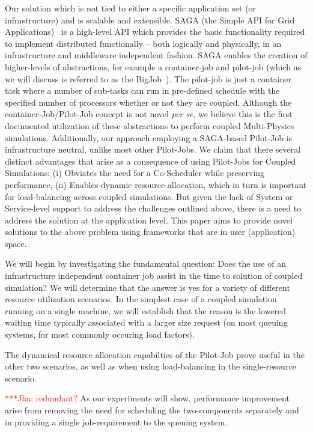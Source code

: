 \documentclass[conference,final]{IEEEtran}
\newcommand{\jhanote}[1]{ {\textcolor{red} { ***Jha: #1 }}}
\newcommand{\jhanote}[1]{}
\begin{document}
Our solution which is not tied to either a specific application set
(or infrastructure) and is scalable and extensible. SAGA (the Simple
API for Grid Applications)~\cite{saga_web} is a high-level API which
provides the basic functionality required to implement distributed
functionally -- both logically and physically, in an infrastructure
and middleware independent fashion. SAGA enables the creation of
higher-levels of abstractions, for example a container-job and
pilot-job (which as we will discuss is referred to as the
BigJob~\cite{saga_royalsoc}).  The pilot-job is just a container task
where a number of sub-tasks can run in pre-defined schedule with the
specified number of processors whether or not they are
coupled. Although the container-Job/Pilot-Job concept is not novel
{\it per se}, we believe this is the first documented utilization of
these abstractions to perform coupled Multi-Physics
simulations. Additionally, our approach employing a SAGA-based
Pilot-Job is infrastructure neutral, unlike most other Pilot-Jobs. We
claim that there several distinct advantages that arise as a
consequence of using Pilot-Jobs for Coupled Simulations: (i) Obviates
the need for a Co-Scheduler while preserving performance, (ii) Enables
dynamic resource allocation, which in turn is important for
load-balancing across coupled simulations.  But given the lack of
System or Service-level support to address the challenges outlined
above, there is a need to address the solution at the application
level. This paper aims to provide novel solutions to the above problem
using frameworks that are in user (application) space.

We will begin by investigating the fundamental question: Does the use
of an infrastructure independent container job assist in the time to
solution of coupled simulation? We will determine that the answer is
yes for a variety of different resource utilization scenarios. In the
simplest case of a coupled simulation running on a single machine, we
will establish that the reason is the lowered waiting time typically
associated with a larger size request (on most queuing systems, for
most commonly occuring load factors).

The dynamical resource allocation capabilties of the Pilot-Job prove
useful in the other two scenarios, as well as when using
load-balancing in the single-resource scenario.

\jhanote{redundant?} As our experiments will show, performance
improvement arise from removing the need for scheduling the
two-components separately and in providing a single job-requirement to
the queuing system.
\end{document}

